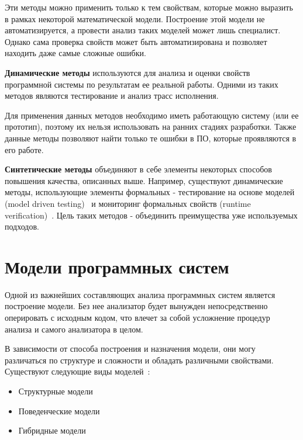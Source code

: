 Эти методы можно применить только к тем свойствам, которые можно выразить в
рамках некоторой математической модели. Построение этой модели не
автоматизируется, а провести анализ таких моделей может лишь специалист. Однако
сама проверка свойств может быть автоматизирована и позволяет находить даже
самые сложные ошибки.

\textbf{Динамические методы} используются для анализа и оценки свойств
программной системы по результатам ее реальной работы. Одними из таких методов
являются тестирование и анализ трасс исполнения.

Для применения данных методов необходимо иметь работающую систему (или ее
прототип), поэтому их нельзя использовать на ранних стадиях разработки. Также
данные методы позволяют найти только те ошибки в ПО, которые проявляются в его
работе.

\textbf{Синтетические методы} объединяют в себе элементы некоторых способов
повышения качества, описанных выше. Например, существуют динамические методы,
использующие элементы формальных - тестирование на основе моделей (model driven
testing)~\cite{Vieira2006} и мониторинг формальных свойств (runtime
verification)~\cite{runtime_verification}. Цель таких методов - объединить
преимущества уже используемых подходов.

\section{Модели программных систем}
\label{sec:system_models}

Одной из важнейших составляющих анализа программных систем является построение
модели. Без нее анализатор будет вынужден непосредственно оперировать с исходным
кодом, что влечет за собой усложнение процедур анализа и самого анализатора в
целом.

В зависимости от способа построения и назначения модели, они могу различаться по
структуре и сложности и обладать различными свойствами. Существуют следующие
виды моделей~\cite{itsykson}:

\begin{itemize}
    \item Структурные модели
    \item Поведенческие модели
    \item Гибридные модели
\end{itemize}

